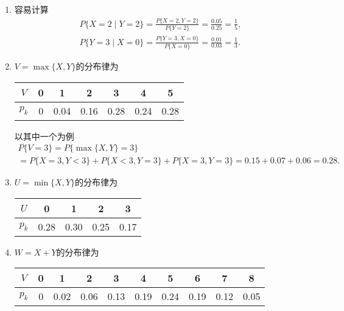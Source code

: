 \setcounter{prob}{35}
\begin{prob}
	\begin{enumerate}
	\item
	容易计算
	\begin{gather*}
		P\{X=2\mid Y=2\}=\frac{P\{X=2, Y=2\}}{P\{Y=2\}}=\frac{0.05}{0.25}=\frac{1}{5},\\
		P\{Y=3\mid X=0\}=\frac{P\{Y=3, X=0\}}{P\{X=0\}}=\frac{0.01}{0.03}=\frac{1}{3}.
	\end{gather*} 
	\item
	$V=\max\{X,Y\}$的分布律为
	\begin{center}
		\begin{tabular}{c|cccccc}
			\hline
			$V$&0&1&2&3&4&5\\
			\hline
			$p_k$&0&0.04&0.16& 0.28&0.24&0.28\\
			\hline
		\end{tabular}
	\end{center}
	以其中一个为例
	\begin{multline*}
		P\{V=3\}=P\{\max\{X,Y\}=3\}\\
		=P\{X=3,Y<3\}+P\{X<3,Y=3\}+P\{X=3,Y=3\}=0.15+0.07+0.06=0.28.
	\end{multline*}
	\item
	$U=\min\{X,Y\}$的分布律为
		\begin{center}
			\begin{tabular}{c|cccc}
				\hline
				$U$&0&1&2&3\\
				\hline
				$p_k$&0.28&0.30&0.25& 0.17\\
				\hline
			\end{tabular}
		\end{center}
	\item
	$W=X+Y$的分布律为
	\begin{center}
		\begin{tabular}{c|ccccccccc}
			\hline
			$V$&0&1&2&3&4&5&6&7&8\\
			\hline
			$p_k$&0&0.02&0.06& 0.13&0.19&0.24&0.19&0.12&0.05\\
			\hline
		\end{tabular}
	\end{center}
	\end{enumerate}
\end{prob}